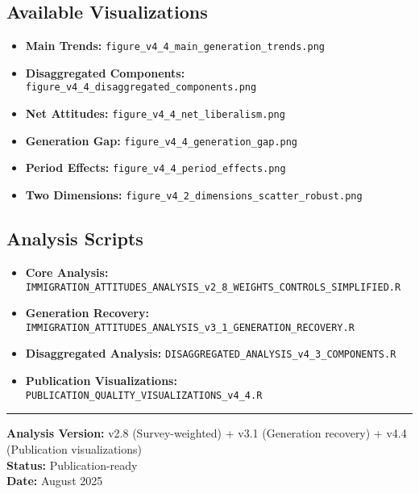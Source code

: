 \documentclass[11pt,letterpaper]{article}
\begin{document}
\subsection{Available Visualizations}
\begin{itemize}
    \item \textbf{Main Trends:} \texttt{figure\_v4\_4\_main\_generation\_trends.png}
    \item \textbf{Disaggregated Components:} \texttt{figure\_v4\_4\_disaggregated\_components.png}
    \item \textbf{Net Attitudes:} \texttt{figure\_v4\_4\_net\_liberalism.png}
    \item \textbf{Generation Gap:} \texttt{figure\_v4\_4\_generation\_gap.png}
    \item \textbf{Period Effects:} \texttt{figure\_v4\_4\_period\_effects.png}
    \item \textbf{Two Dimensions:} \texttt{figure\_v4\_2\_dimensions\_scatter\_robust.png}
\end{itemize}

\subsection{Analysis Scripts}
\begin{itemize}
    \item \textbf{Core Analysis:} \texttt{IMMIGRATION\_ATTITUDES\_ANALYSIS\_v2\_8\_WEIGHTS\_CONTROLS\_SIMPLIFIED.R}
    \item \textbf{Generation Recovery:} \texttt{IMMIGRATION\_ATTITUDES\_ANALYSIS\_v3\_1\_GENERATION\_RECOVERY.R}
    \item \textbf{Disaggregated Analysis:} \texttt{DISAGGREGATED\_ANALYSIS\_v4\_3\_COMPONENTS.R}
    \item \textbf{Publication Visualizations:} \texttt{PUBLICATION\_QUALITY\_VISUALIZATIONS\_v4\_4.R}
\end{itemize}

\vspace{1em}
\noindent\rule{\textwidth}{0.4pt}

\begin{center}
\textbf{Analysis Version:} v2.8 (Survey-weighted) + v3.1 (Generation recovery) + v4.4 (Publication visualizations)\\
\textbf{Status:} Publication-ready\\
\textbf{Date:} August 2025
\end{center}
\end{document}
